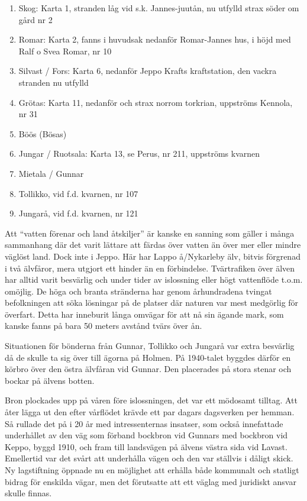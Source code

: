 \begin{enumerate}
  \item Skog: Karta 1, stranden låg vid s.k. Jannes-juutån, nu utfylld strax söder om gård nr 2
  \item Romar: Karta 2, fanns i huvudsak nedanför Romar-Jannes hus, i höjd med Ralf o Svea Romar, nr 10
  \item Silvast / Fors: Karta 6, nedanför Jeppo Krafts kraftstation, den vackra stranden nu utfylld
  \item Grötas: Karta 11, nedanför och strax norrom torkrian, uppströms Kennola, nr 31
  \item Böös (Bösas)
  \item Jungar / Ruotsala: Karta 13, se Perus, nr 211, uppströms kvarnen
  \item Mietala / Gunnar
  \item Tollikko, vid f.d. kvarnen, nr 107
  \item Jungarå, vid f.d. kvarnen, nr 121
\end{enumerate}


%

Att ``vatten förenar och land åtskiljer'' är kanske en sanning som gäller i många sammanhang där det varit lättare att färdas över vatten än över mer eller mindre väglöst land. Dock inte i Jeppo. Här har Lappo å/Nykarleby älv, bitvis förgrenad i två älvfåror, mera utgjort ett hinder än en förbindelse. Tvärtrafiken över älven har alltid varit besvärlig och under tider av islossning eller högt vattenflöde t.o.m. omöjlig. De höga och branta stränderna har genom århundradena tvingat befolkningen att söka lösningar på de platser där naturen var mest medgörlig för överfart. Detta har inneburit långa omvägar för att nå sin ägande mark, som kanske fanns på bara 50 meters avstånd tvärs över ån.

Situationen för bönderna från Gunnar, Tollikko och Jungarå var extra besvärlig då de skulle ta sig över till ägorna på Holmen. På 1940-talet byggdes därför en körbro över den östra älvfåran vid Gunnar. Den placerades på stora stenar och bockar på älvens botten.

Bron plockades upp på våren före islossningen, det var ett mödosamt tilltag. Att åter lägga ut den efter vårflödet krävde ett par dagars dagsverken per hemman. Så rullade det på i 20 år med intressenternas insatser, som också innefattade underhållet av den väg som förband bockbron vid Gunnars med bockbron vid Keppo, byggd 1910, och fram till landsvägen på älvens västra sida vid Lavast. Emellertid var det svårt att underhålla vägen och den var ställvis i dåligt skick. Ny lagstiftning öppnade nu en möjlighet att erhålla både kommunalt och statligt bidrag för enskilda vägar, men det förutsatte att ett väglag med juridiskt ansvar skulle finnas.

